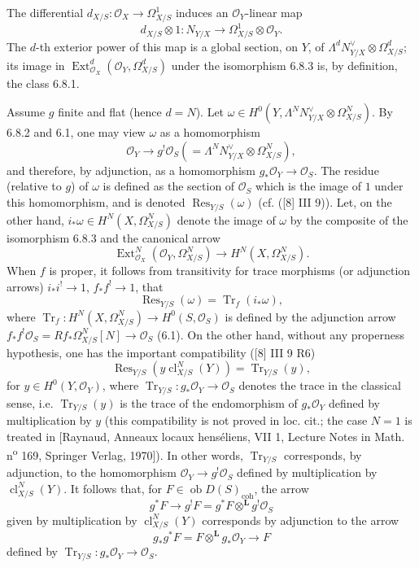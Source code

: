 \documentclass[11pt]{article}
\DeclareMathOperator{\Ext}{Ext}
\newcommand{\ob}{\operatorname{ob}}
\providecommand{\cl}{\operatorname{cl}}
\providecommand{\OO}{\mathcal{O}}
\providecommand{\LL}{\mathbf L}
\providecommand{\coh}{\mathrm{coh}}
\providecommand{\ob}{\operatorname{ob}}
\providecommand{\cl}{\operatorname{cl}}
\providecommand{\coh}{\mathrm{coh}}
\begin{document}
The differential $d_{X/S}:\OO_X\to\Omega^1_{X/S}$ induces an $\OO_Y$-linear map
\[
d_{X/S}\otimes 1:N_{Y/X}\longrightarrow \Omega^1_{X/S}\otimes\OO_Y.
\]
The $d$-th exterior power of this map is a global section, on $Y$, of $\Lambda^d N_{Y/X}^{\vee}\otimes\Omega^d_{X/S}$; its image in $\Ext^d_{\OO_X}(\OO_Y,\Omega^d_{X/S})$ under the isomorphism 6.8.3 is, by definition, the class 6.8.1.

Assume $g$ finite and flat (hence $d=N$). Let $\omega\in H^0(Y,\Lambda^N N_{Y/X}^{\vee}\otimes\Omega^N_{X/S})$. By 6.8.2 and 6.1, one may view $\omega$ as a homomorphism
\[
\OO_Y\longrightarrow g^!\OO_S(=\Lambda^N N_{Y/X}^{\vee}\otimes\Omega^N_{X/S}),
\]
and therefore, by adjunction, as a homomorphism $g_*\OO_Y\to\OO_S$. The residue (relative to $g$) of $\omega$ is defined as the section of $\OO_S$ which is the image of $1$ under this homomorphism, and is denoted $\operatorname{Res}_{Y/S}(\omega)$ (cf. ([8] III 9)). Let, on the other hand, $i_*\omega\in H^N(X,\Omega^N_{X/S})$ denote the image of $\omega$ by the composite of the isomorphism 6.8.3 and the canonical arrow
\[
\Ext^N_{\OO_X}(\OO_Y,\Omega^N_{X/S})\longrightarrow H^N(X,\Omega^N_{X/S}).
\]
When $f$ is proper, it follows from transitivity for trace morphisms (or adjunction arrows) $i_*i^!\to 1$, $f_*f^!\to 1$, that
\begin{equation}
\tag{6.8.4}
\operatorname{Res}_{Y/S}(\omega)=\operatorname{Tr}_f(i_*\omega),
\end{equation}
where $\operatorname{Tr}_f:H^N(X,\Omega^N_{X/S})\to H^0(S,\OO_S)$ is defined by the adjunction arrow $f_*f^!\OO_S=Rf_*\Omega^N_{X/S}[N]\to\OO_S$ (6.1). On the other hand, without any properness hypothesis, one has the important compatibility ([8] III 9 R6)
\begin{equation}
\tag{6.8.5}
\operatorname{Res}_{Y/S}(y\cl^N_{X/S}(Y))=\operatorname{Tr}_{Y/S}(y),
\end{equation}
for $y\in H^0(Y,\OO_Y)$, where $\operatorname{Tr}_{Y/S}:g_*\OO_Y\to\OO_S$ denotes the trace in the classical sense, i.e. $\operatorname{Tr}_{Y/S}(y)$ is the trace of the endomorphism of $g_*\OO_Y$ defined by multiplication by $y$ (this compatibility is not proved in loc. cit.; the case $N=1$ is treated in [Raynaud, Anneaux locaux henséliens, VII 1, Lecture Notes in Math. n\textsuperscript{o} 169, Springer Verlag, 1970]). In other words, $\operatorname{Tr}_{Y/S}$ corresponds, by adjunction, to the homomorphism $\OO_Y\to g^!\OO_S$ defined by multiplication by $\cl^N_{X/S}(Y)$. It follows that, for $F\in\ob D(S)_{\coh}$, the arrow
\begin{equation}
\tag{6.8.6}
g^*F\longrightarrow g^!F=g^*F\otimes^{\LL}g^!\OO_S
\end{equation}
given by multiplication by $\cl^N_{X/S}(Y)$ corresponds by adjunction to the arrow
\begin{equation}
\tag{6.8.7}
g_*g^*F=F\otimes^{\LL}g_*\OO_Y\longrightarrow F
\end{equation}
defined by $\operatorname{Tr}_{Y/S}:g_*\OO_Y\to\OO_S$.
\end{document}
